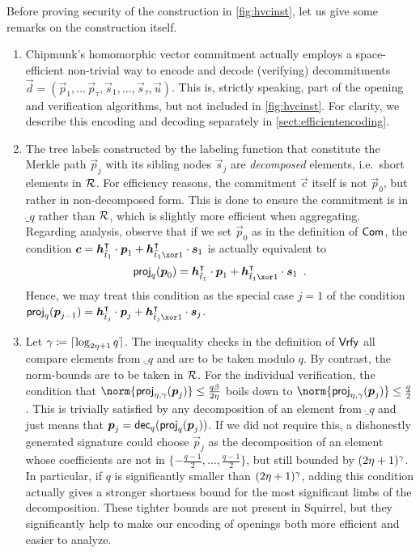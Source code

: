 \begin{remark}\label{rmk:hvc}
Before proving security of the construction in \autoref{fig:hvcinst}, let us give some remarks on the construction itself.
\begin{enumerate}
\item Chipmunk's homomorphic vector commitment actually employs a space-efficient non-trivial way to encode and decode (verifying) decommitments $\vec{d} = (\vec{p}_1,\ldots\,\vec{p}_\tau,\vec{s}_1,\ldots,\vec{s}_\tau,\vec{u})$.
This is, strictly speaking, part of the opening and verification algorithms, but not included in \autoref{fig:hvcinst}.
For clarity, we describe this encoding and decoding separately in \autoref{sect:efficientencoding}.
\item The tree labels constructed by the labeling function that constitute the Merkle path $\vec{p}_j$ with its sibling nodes $\vec{s}_j$ are \emph{decomposed} elements, i.e.\ short elements in $\mathcal{R}$.
For efficiency reasons, the commitment $\vec{c}$ itself is not $\vec{p}_0$, but rather in non-decomposed form. This is done to ensure the commitment is in $\ring_q$ rather than $\mathcal{R}$, which is slightly more efficient when aggregating.
Regarding analysis, observe that if we set $\vec{p}_0$ as in the definition of $\mathsf{Com}$, the condition $\vec{c} = \vec{h}_{\tilde t_1}^\transpose\cdot \vec{p}_{1} + \vec{h}_{\tilde t_1 \xor 1}^\transpose \cdot \vec{s}_{1}$ is actually equivalent to
\[
\projmod{q}(\vec{p}_0) = \vec{h}_{\tilde t_1}^\transpose\cdot \vec{p}_{1} + \vec{h}_{\tilde t_1 \xor 1}^\transpose \cdot \vec{s}_{1}\enspace.
\]
Hence, we may treat this condition as the special case $j=1$ of the condition $\projmod{q}(\vec{p}_{j-1}) = \vec{h}_{\tilde t_j}^\transpose\cdot \vec{p}_{j} + \vec{h}_{\tilde t_j \xor 1}^\transpose \cdot \vec{s}_{j}$.
\item Let $\gamma \coloneqq \lceil \log_{2\eta+1} q\rceil$.
The inequality checks in the definition of $\mathsf{Vrfy}$ all compare elements from $\ring_q$ and are to be taken modulo $q$. By contrast, the norm-bounds are to be taken in $\mathcal{R}$.
For the individual verification, the condition that $\norm{\projring(\vec{p}_j)} \leq \tfrac{q\beta}{2\eta}$ boils down to $\norm{\projring(\vec{p}_j)} \leq \tfrac{q}{2}$.
This is trivially satisfied by any decomposition of an element from $\ring_q$ and just means that $\boldsymbol{p}_j = \mathsf{dec}_{q}(\mathsf{proj}_{q}(\boldsymbol{p}_j))$.
If we did not require this, a dishonestly generated signature could choose $\vec{p}_j$ as the decomposition of an element whose coefficients are not in $\{-\tfrac{q-1}{2},\ldots,\tfrac{q-1}{2}\}$, but still bounded by $(2\eta+1)^\gamma$.
In particular, if $q$ is significantly smaller than $(2\eta+1)^\gamma$, adding this condition actually gives a stronger shortness bound for the most significant limbs of the decomposition.
These tighter bounds are not present in Squirrel, but they significantly help to make our encoding of openings both more efficient and easier to analyze.
\end{enumerate}
\end{remark}

